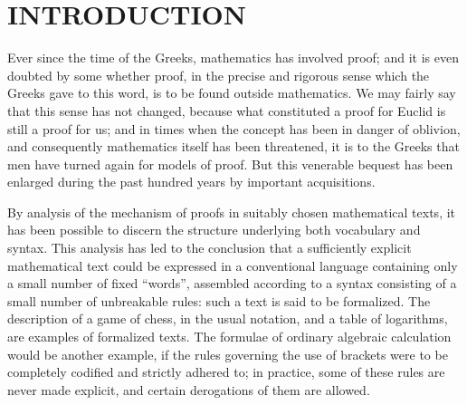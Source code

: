 \chapter*{INTRODUCTION}
{}

Ever since the time of the Greeks, mathematics has involved proof; and it is even doubted by some whether proof, in the precise and rigorous sense which the Greeks gave to this word, is to be found outside mathematics. We may fairly say that this sense has not changed, because what constituted a proof for Euclid is still a proof for us; and in times when the concept has been in danger of oblivion, and consequently mathematics itself has been threatened, it is to the Greeks that men have turned again for models of proof. But this venerable bequest has been enlarged during the past hundred years by important acquisitions.

By analysis of the mechanism of proofs in suitably chosen mathematical texts, it has been possible to discern the structure underlying both vocabulary and syntax. This analysis has led to the conclusion that a sufficiently explicit mathematical text could be expressed in a conventional language containing only a small number of fixed ``words'', assembled according to a syntax consisting of a small number of unbreakable rules: such a text is said to be formalized. The description of a game of chess, in the usual notation, and a table of logarithms, are examples of formalized texts. The formulae of ordinary algebraic calculation would be another example, if the rules governing the use of brackets were to be completely codified and strictly adhered to; in practice, some of these rules are never made explicit, and certain derogations of them are allowed.

